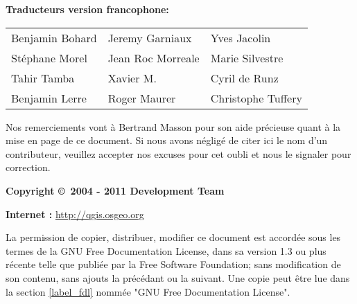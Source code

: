 \begin{flushleft}
\textbf{Traducteurs version francophone:}
  \par\bigskip\noindent
\begin{tabular}{p{4cm} p{4cm} p{4cm}}
Benjamin Bohard & Jeremy Garniaux & Yves Jacolin \\
Stéphane Morel & Jean Roc Morreale & Marie Silvestre \\
Tahir Tamba & Xavier M. & Cyril de Runz \\
Benjamin Lerre & Roger Maurer & Christophe Tuffery \\
\end{tabular}
\end{flushleft}

Nos remerciements vont à Bertrand Masson pour son aide précieuse quant à la mise 
en page de ce document. Si nous avons négligé de citer ici le 
nom d'un contributeur, veuillez accepter nos excuses pour cet oubli et nous le 
signaler pour correction.
\par\bigskip\noindent
\textbf{Copyright \copyright~2004 - 2011 \QG Development Team}
\par\bigskip\noindent
\textbf{Internet :} \url{http://qgis.osgeo.org}


La permission de copier, distribuer, modifier ce document est accordée sous les 
termes de la GNU Free Documentation License, dans sa version 1.3 ou plus récente 
telle que publiée par la Free Software Foundation; sans modification de son 
contenu, sans ajouts la précédant ou la suivant. Une copie peut être lue dans 
la section \ref{label_fdl} nommée "GNU Free Documentation License".

\newpage
